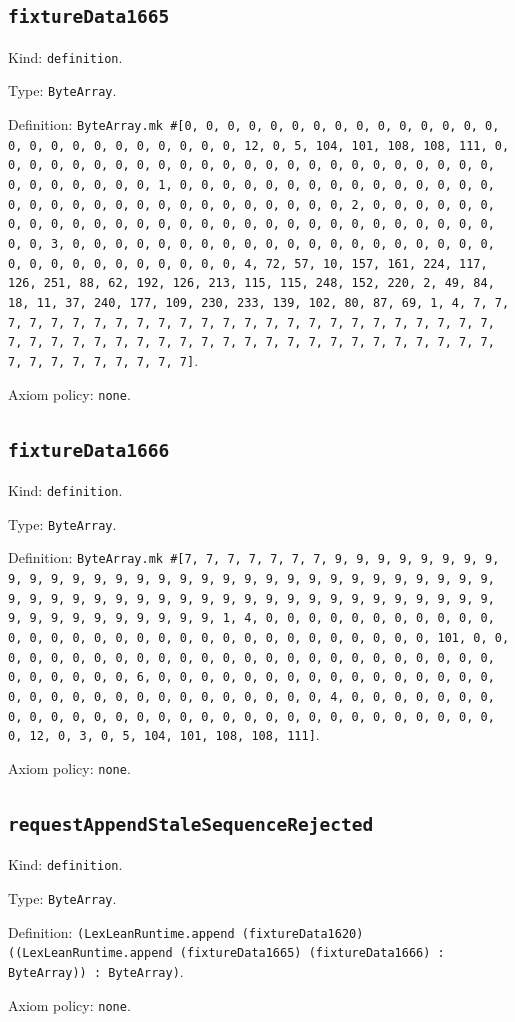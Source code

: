 \documentclass[11pt]{article}
\begin{document}
\subsection*{\texttt{fixtureData1665}}
\noindent Kind: \texttt{definition}.\par
\noindent Type: \texttt{ByteArray}.\par
\noindent Definition: \texttt{ByteArray.mk \#[0, 0, 0, 0, 0, 0, 0, 0, 0, 0, 0, 0, 0, 0, 0, 0, 0, 0, 0, 0, 0, 0, 0, 0, 0, 0, 12, 0, 5, 104, 101, 108, 108, 111, 0, 0, 0, 0, 0, 0, 0, 0, 0, 0, 0, 0, 0, 0, 0, 0, 0, 0, 0, 0, 0, 0, 0, 0, 0, 0, 0, 0, 0, 0, 0, 1, 0, 0, 0, 0, 0, 0, 0, 0, 0, 0, 0, 0, 0, 0, 0, 0, 0, 0, 0, 0, 0, 0, 0, 0, 0, 0, 0, 0, 0, 0, 0, 2, 0, 0, 0, 0, 0, 0, 0, 0, 0, 0, 0, 0, 0, 0, 0, 0, 0, 0, 0, 0, 0, 0, 0, 0, 0, 0, 0, 0, 0, 0, 0, 3, 0, 0, 0, 0, 0, 0, 0, 0, 0, 0, 0, 0, 0, 0, 0, 0, 0, 0, 0, 0, 0, 0, 0, 0, 0, 0, 0, 0, 0, 0, 0, 4, 72, 57, 10, 157, 161, 224, 117, 126, 251, 88, 62, 192, 126, 213, 115, 115, 248, 152, 220, 2, 49, 84, 18, 11, 37, 240, 177, 109, 230, 233, 139, 102, 80, 87, 69, 1, 4, 7, 7, 7, 7, 7, 7, 7, 7, 7, 7, 7, 7, 7, 7, 7, 7, 7, 7, 7, 7, 7, 7, 7, 7, 7, 7, 7, 7, 7, 7, 7, 7, 7, 7, 7, 7, 7, 7, 7, 7, 7, 7, 7, 7, 7, 7, 7, 7, 7, 7, 7, 7, 7, 7, 7, 7, 7]}.\par
\noindent Axiom policy: \texttt{none}.\par
\subsection*{\texttt{fixtureData1666}}
\noindent Kind: \texttt{definition}.\par
\noindent Type: \texttt{ByteArray}.\par
\noindent Definition: \texttt{ByteArray.mk \#[7, 7, 7, 7, 7, 7, 7, 9, 9, 9, 9, 9, 9, 9, 9, 9, 9, 9, 9, 9, 9, 9, 9, 9, 9, 9, 9, 9, 9, 9, 9, 9, 9, 9, 9, 9, 9, 9, 9, 9, 9, 9, 9, 9, 9, 9, 9, 9, 9, 9, 9, 9, 9, 9, 9, 9, 9, 9, 9, 9, 9, 9, 9, 9, 9, 9, 9, 9, 9, 9, 9, 1, 4, 0, 0, 0, 0, 0, 0, 0, 0, 0, 0, 0, 0, 0, 0, 0, 0, 0, 0, 0, 0, 0, 0, 0, 0, 0, 0, 0, 0, 0, 0, 0, 101, 0, 0, 0, 0, 0, 0, 0, 0, 0, 0, 0, 0, 0, 0, 0, 0, 0, 0, 0, 0, 0, 0, 0, 0, 0, 0, 0, 0, 0, 0, 0, 6, 0, 0, 0, 0, 0, 0, 0, 0, 0, 0, 0, 0, 0, 0, 0, 0, 0, 0, 0, 0, 0, 0, 0, 0, 0, 0, 0, 0, 0, 0, 0, 4, 0, 0, 0, 0, 0, 0, 0, 0, 0, 0, 0, 0, 0, 0, 0, 0, 0, 0, 0, 0, 0, 0, 0, 0, 0, 0, 0, 0, 0, 0, 0, 12, 0, 3, 0, 5, 104, 101, 108, 108, 111]}.\par
\noindent Axiom policy: \texttt{none}.\par
\subsection*{\texttt{requestAppendStaleSequenceRejected}}
\noindent Kind: \texttt{definition}.\par
\noindent Type: \texttt{ByteArray}.\par
\noindent Definition: \texttt{(LexLeanRuntime.append (fixtureData1620) ((LexLeanRuntime.append (fixtureData1665) (fixtureData1666) : ByteArray)) : ByteArray)}.\par
\noindent Axiom policy: \texttt{none}.\par
\end{document}
